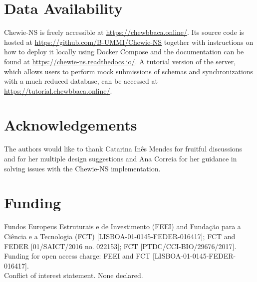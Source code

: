 \section{Data Availability} \label{sec:ch3_data_availability}

\ac{Chewie-NS} is freely accessible at \url{https://chewbbaca.online/}. Its source code is hosted at \url{https://github.com/B-UMMI/Chewie-NS} together with instructions on how to deploy it locally using Docker Compose and the documentation can be found at \url{https://chewie-ns.readthedocs.io/}. A tutorial version of the server, which allows users to perform mock submissions of schemas and synchronizations with a much reduced database, can be accessed at \url{https://tutorial.chewbbaca.online/}.

\section{Acknowledgements} \label{sec:ch3_data_acknowledgements}

The authors would like to thank Catarina Inês Mendes for fruitful discussions and for her multiple design suggestions and Ana Correia for her guidance in solving issues with the \ac{Chewie-NS} implementation.

\section{Funding} \label{sec:ch3_data_funding}

Fundos Europeus Estruturais e de Investimento (FEEI) and Fundação para a Ciência e a Tecnologia (\ac{FCT}) [LISBOA-01-0145-FEDER-016417]; FCT and FEDER [01/SAICT/2016 no. 022153]; FCT [PTDC/CCI-BIO/29676/2017]. Funding for open access charge: FEEI and FCT [LISBOA-01-0145-FEDER-016417]. \\
Conflict of interest statement. None declared.
